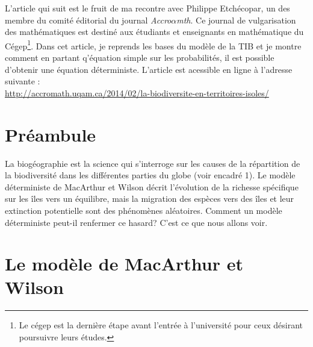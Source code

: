 \label{annI}
\addtocounter{chapter}{1}
\setcounter{equation}{0}



L'article qui suit est le fruit de ma recontre avec Philippe Etchécopar, un des membre du comité éditorial du journal \emph{Accro$\alpha$mth}.
Ce journal de vulgarisation des mathématiques est destiné aux étudiants et enseignants en mathématique du Cégep\footnote{Le cégep est la dernière étape avant l'entrée à l'université pour ceux désirant poursuivre leurs études.}.
Dans cet article, je reprends les bases du modèle de la TIB et je montre comment en partant q'équation simple sur les probabilités, il est possible d'obtenir une équation déterministe. L'article est acessible en ligne à l'adresse suivante : \\ \url{http://accromath.uqam.ca/2014/02/la-biodiversite-en-territoires-isoles/}


\section{Préambule}
	La biogéographie est la science qui s’interroge sur les causes de la répartition de la biodiversité dans les différentes parties du globe (voir encadré 1). Le modèle déterministe de MacArthur et Wilson décrit l’évolution de la richesse spécifique sur les îles vers un équilibre, mais la migration des espèces vers des îles et leur extinction potentielle sont des phénomènes aléatoires. Comment un modèle déterministe peut-il renfermer ce hasard? C’est ce que nous allons voir.

\section{Le modèle de MacArthur et Wilson}

